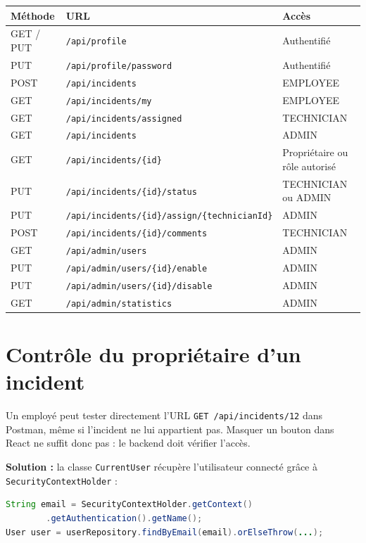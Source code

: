 \documentclass{rapportENSET}
\begin{document}
\begin{center}
\begin{tabular}{lll}
\toprule
\textbf{M\'ethode} & \textbf{URL} & \textbf{Acc\`es} \\
\midrule
GET / PUT & \texttt{/api/profile} & Authentifi\'e \\
PUT & \texttt{/api/profile/password} & Authentifi\'e \\
POST & \texttt{/api/incidents} & EMPLOYEE \\
GET & \texttt{/api/incidents/my} & EMPLOYEE \\
GET & \texttt{/api/incidents/assigned} & TECHNICIAN \\
GET & \texttt{/api/incidents} & ADMIN \\
GET & \texttt{/api/incidents/\{id\}} & Propri\'etaire ou r\^ole autoris\'e \\
PUT & \texttt{/api/incidents/\{id\}/status} & TECHNICIAN ou ADMIN \\
PUT & \texttt{/api/incidents/\{id\}/assign/\{technicianId\}} & ADMIN \\
POST & \texttt{/api/incidents/\{id\}/comments} & TECHNICIAN \\
GET & \texttt{/api/admin/users} & ADMIN \\
PUT & \texttt{/api/admin/users/\{id\}/enable} & ADMIN \\
PUT & \texttt{/api/admin/users/\{id\}/disable} & ADMIN \\
GET & \texttt{/api/admin/statistics} & ADMIN \\
\bottomrule
\end{tabular}
\end{center}

\section{Contr\^ole du propri\'etaire d'un incident}

Un employ\'e peut tester directement l'URL \texttt{GET /api/incidents/12} dans Postman, m\^eme si l'incident ne lui appartient pas. Masquer un bouton dans React ne suffit donc pas : le backend doit v\'erifier l'acc\`es.

\textbf{Solution :} la classe \texttt{CurrentUser} r\'ecup\`ere l'utilisateur connect\'e gr\^ace \`a \texttt{SecurityContextHolder} :

\begin{lstlisting}[language=Java]
String email = SecurityContextHolder.getContext()
        .getAuthentication().getName();
User user = userRepository.findByEmail(email).orElseThrow(...);
\end{lstlisting}
\end{document}
